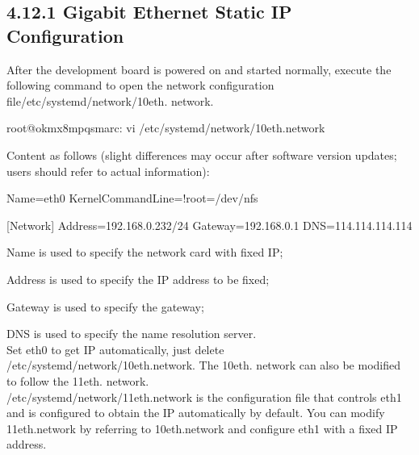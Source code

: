 \documentclass[letterpaper,10pt,openany,english]{sphinxmanual}
\begin{document}
\subsection{4.12.1 Gigabit Ethernet Static IP Configuration}
\label{\detokenize{linux-manual:gigabit-ethernet-static-ip-configuration}}
\sphinxAtStartPar
{}

\sphinxAtStartPar
After the development board is powered on and started normally, execute the following command to open the network configuration file/etc/systemd/network/10\sphinxhyphen{}eth. network.

\begin{sphinxVerbatim}[commandchars=\\\{\}]
root@ok\PYGZhy{}mx8mpq\PYGZhy{}smarc:\PYGZti{}\PYGZsh{} vi /etc/systemd/network/10\PYGZhy{}eth.network
\end{sphinxVerbatim}

\sphinxAtStartPar
Content as follows (slight differences may occur after software version updates; users should refer to actual information):

\begin{sphinxVerbatim}[commandchars=\\\{\}]
[Match]
Name=eth0
KernelCommandLine=!root=/dev/nfs

[Network]
Address=192.168.0.232/24
Gateway=192.168.0.1
DNS=114.114.114.114
\end{sphinxVerbatim}

\sphinxAtStartPar
Name is used to specify the network card with fixed IP;

\sphinxAtStartPar
Address is used to specify the IP address to be fixed;

\sphinxAtStartPar
Gateway is used to specify the gateway;

\sphinxAtStartPar
DNS is used to specify the name resolution server.\\
Set eth0 to get IP automatically, just delete /etc/systemd/network/10\sphinxhyphen{}eth.network. The 10\sphinxhyphen{}eth. network can also be modified to follow the 11\sphinxhyphen{}eth. network.\\
/etc/systemd/network/11\sphinxhyphen{}eth.network is the configuration file that controls eth1 and is configured to obtain the IP automatically by default. You can modify 11\sphinxhyphen{}eth.network by referring to 10\sphinxhyphen{}eth.network and configure eth1 with a fixed IP address.
\end{document}
